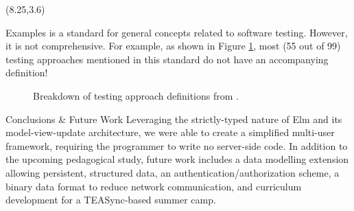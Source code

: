 \documentclass[22pt]{beamer}
\begin{document}
\begin{frame}[fragile]
    \begin{textblock}{7.25}(8.25,3.6)
        \begin{block}{\fontsize{37}{20}\selectfont Examples}
            \citep{IEEE2022} is a standard for general concepts related to
            software testing. However, it is not comprehensive. For example, as
            shown in Figure \ref{Fig:defs}, most (55 out of 99) testing
            approaches mentioned in this standard do not have an accompanying
            definition!

            \begin{figure}
                \label{Fig:defs}
                \caption{Breakdown of testing approach definitions from \cite{IEEE2022}.}
            \end{figure}


            \vspace{-5mm}
        \end{block}

        \begin{block}{\fontsize{37}{20}\selectfont Conclusions \& Future Work}
            Leveraging the strictly-typed nature of Elm and its model-view-update architecture, we were able
            to create a simplified multi-user framework, requiring the programmer to write no server-side code. In addition to the upcoming pedagogical study, future work includes a data modelling extension allowing persistent, structured data, an
            authentication/authorization scheme, a binary data format to reduce network communication, and
            curriculum development for a TEASync-based summer camp.
        \end{block}


\end{textblock}
\end{frame}
\end{document}

